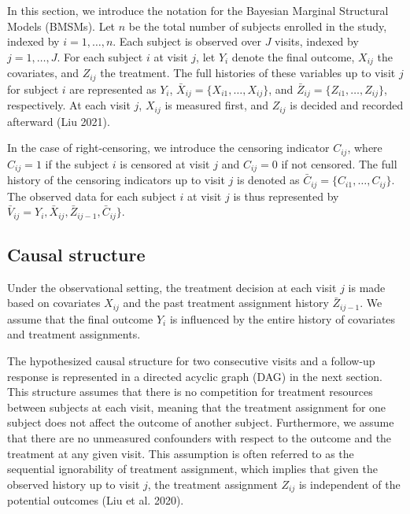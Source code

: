 In this section, we introduce the notation for the Bayesian Marginal Structural Models (BMSMs). Let \(n\) be the total number of subjects enrolled in the study, indexed by \(i = 1, \ldots, n\). Each subject is observed over \(J\) visits, indexed by \(j = 1, \ldots, J\). For each subject \(i\) at visit \(j\), let \(Y_{i}\) denote the final outcome, \(X_{ij}\) the covariates, and \(Z_{ij}\) the treatment. The full histories of these variables up to visit \(j\) for subject \(i\) are represented as \(Y_{i}\), \(\bar{X}_{ij} = \{X_{i1}, \ldots, X_{ij}\}\), and \(\bar{Z}_{ij} = \{Z_{i1}, \ldots, Z_{ij}\}\), respectively. At each visit \(j\), \(X_{ij}\) is measured first, and \(Z_{ij}\) is decided and recorded afterward (Liu 2021).

In the case of right-censoring, we introduce the censoring indicator \(C_{ij}\), where \(C_{ij} = 1\) if the subject \(i\) is censored at visit \(j\) and \(C_{ij} = 0\) if not censored. The full history of the censoring indicators up to visit \(j\) is denoted as \(\bar{C}_{ij} = \{C_{i1}, \ldots, C_{ij}\}\). The observed data for each subject \(i\) at visit \(j\) is thus represented by \(\bar{V}_{ij} = Y_{i}, \bar{X}_{ij}, \bar{Z}_{ij-1}, \bar{C}_{ij}\}\).

\subsection{Causal structure}\label{causal-structure}

Under the observational setting, the treatment decision at each visit \(j\) is made based on covariates \(X_{ij}\) and the past treatment assignment history \(\bar{Z}_{ij-1}\). We assume that the final outcome \(Y_{i}\) is influenced by the entire history of covariates and treatment assignments.

The hypothesized causal structure for two consecutive visits and a follow-up response is represented in a directed acyclic graph (DAG) in the next section. This structure assumes that there is no competition for treatment resources between subjects at each visit, meaning that the treatment assignment for one subject does not affect the outcome of another subject. Furthermore, we assume that there are no unmeasured confounders with respect to the outcome and the treatment at any given visit. This assumption is often referred to as the sequential ignorability of treatment assignment, which implies that given the observed history up to visit \(j\), the treatment assignment \(Z_{ij}\) is independent of the potential outcomes (Liu et al. 2020).

